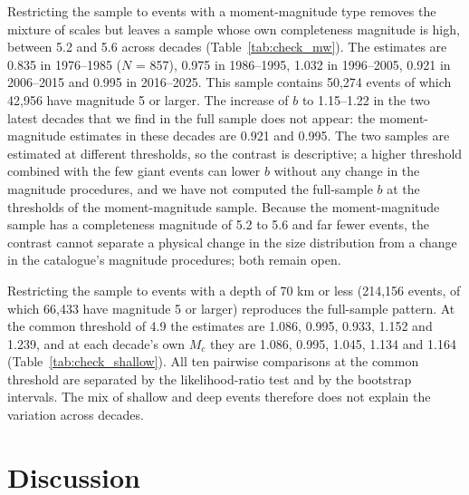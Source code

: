 \documentclass[11pt]{article}
\begin{document}
Restricting the sample to events with a moment-magnitude type removes the mixture of scales but leaves a sample whose own completeness magnitude is high, between 5.2 and 5.6 across decades (Table~\ref{tab:check_mw}). The estimates are 0.835 in 1976--1985 ($N$ = 857), 0.975 in 1986--1995, 1.032 in 1996--2005, 0.921 in 2006--2015 and 0.995 in 2016--2025.
This sample contains 50,274 events of which 42,956 have magnitude 5 or larger.
The increase of $b$ to 1.15--1.22 in the two latest decades that we find in the full sample does not appear: the moment-magnitude estimates in these decades are 0.921 and 0.995. The two samples are estimated at different thresholds, so the contrast is descriptive; a higher threshold combined with the few giant events can lower $b$ without any change in the magnitude procedures, and we have not computed the full-sample $b$ at the thresholds of the moment-magnitude sample. Because the moment-magnitude sample has a completeness magnitude of 5.2 to 5.6 and far fewer events, the contrast cannot separate a physical change in the size distribution from a change in the catalogue's magnitude procedures; both remain open.



Restricting the sample to events with a depth of 70 km or less (214,156 events, of which 66,433 have magnitude 5 or larger) reproduces the full-sample pattern. At the common threshold of 4.9 the estimates are 1.086, 0.995, 0.933, 1.152 and 1.239, and at each decade's own $M_c$ they are 1.086, 0.995, 1.045, 1.134 and 1.164 (Table~\ref{tab:check_shallow}).
All ten pairwise comparisons at the common threshold are separated by the likelihood-ratio test and by the bootstrap intervals. The mix of shallow and deep events therefore does not explain the variation across decades.



\section{Discussion}
\end{document}

